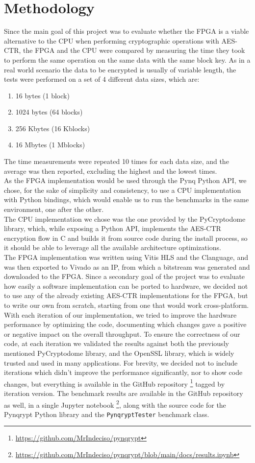\documentclass[12pt,oneside,a4paper]{article}
\def\CC{{C\nolinebreak[4]\hspace{-.05em}\raisebox{.4ex}{\tiny\bf ++}}}
\begin{document}
\section{Methodology} \label{sec:methodology}
Since the main goal of this project was to evaluate whether the FPGA is a viable alternative to the CPU when performing cryptographic operations with AES-CTR, the FPGA and the CPU were compared by measuring the time they took to perform the same operation on the same data with the same block key.
As in a real world scenario the data to be encrypted is usually of variable length, the tests were performed on a set of 4 different data sizes, which are:
\begin{enumerate}
	\item 16 bytes (1 block)
	\item 1024 bytes (64 blocks)
	\item 256 Kbytes (16 Kblocks)
	\item 16 Mbytes (1 Mblocks)
\end{enumerate}
The time measurements were repeated 10 times for each data size, and the average was then reported, excluding the highest and the lowest times.
\\As the FPGA implementation would be used through the Pynq Python API, we chose, for the sake of simplicity and consistency, to use a CPU implementation with Python bindings, which would enable us to run the benchmarks in the same environment, one after the other.
\\The CPU implementation we chose was the one provided by the PyCryptodome library, which, while exposing a Python API, implements the AES-CTR encryption flow in C and builds it from source code during the install process, so it should be able to leverage all the available architecture optimizations.
\\The FPGA implementation was written using Vitis HLS and the \CC language, and was then exported to Vivado as an IP, from which a bitstream was generated and downloaded to the FPGA.
Since a secondary goal of the project was to evaluate how easily a software implementation can be ported to hardware, we decided not to use any of the already existing AES-CTR implementations for the FPGA, but to write our own from scratch, starting from one that would work cross-platform.
With each iteration of our implementation, we tried to improve the hardware performance by optimizing the code, documenting which changes gave a positive or negative impact on the overall throughput.
To ensure the correctness of our code, at each iteration we validated the results against both the previously mentioned PyCryptodome library, and the OpenSSL library, which is widely trusted and used in many applications.
For brevity, we decided not to include iterations which didn't improve the performance significantly, nor to show code changes, but everything is available in the GitHub repository \footnote{\url{https://github.com/MrIndeciso/pynqrypt}} tagged by iteration version.
The benchmark results are available in the GitHub repository as well, in a single Jupyter notebook \footnote{\url{https://github.com/MrIndeciso/pynqrypt/blob/main/docs/results.ipynb}}, along with the source code for the Pynqrypt Python library and the \texttt{PynqryptTester} benchmark class.
\end{document}
